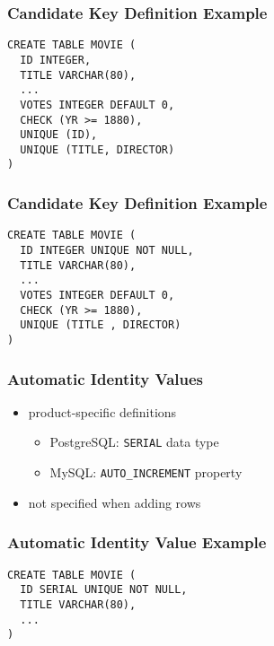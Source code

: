 \documentclass[dvipsnames]{beamer}
\theoremstyle{plain}
\begin{document}
\begin{frame}[fragile]
  \frametitle{Candidate Key Definition Example}

  \begin{example}
    \begin{lstlisting}
CREATE TABLE MOVIE (
  ID INTEGER,
  TITLE VARCHAR(80),
  ...
  VOTES INTEGER DEFAULT 0,
  CHECK (YR >= 1880),
  UNIQUE (ID),
  UNIQUE (TITLE, DIRECTOR)
)
    \end{lstlisting}
  \end{example}
\end{frame}

\begin{frame}[fragile]
  \frametitle{Candidate Key Definition Example}

  \begin{example}
    \begin{lstlisting}
CREATE TABLE MOVIE (
  ID INTEGER UNIQUE NOT NULL,
  TITLE VARCHAR(80),
  ...
  VOTES INTEGER DEFAULT 0,
  CHECK (YR >= 1880),
  UNIQUE (TITLE , DIRECTOR)
)
   \end{lstlisting}
  \end{example}
\end{frame}

\begin{frame}[fragile]
  \frametitle{Automatic Identity Values}

  \begin{itemize}
    \item product-specific definitions

    \begin{itemize}
      \item PostgreSQL: \texttt{SERIAL} data type
      \item MySQL: \texttt{AUTO\_INCREMENT} property
    \end{itemize}

    \pause
    \item not specified when adding rows
  \end{itemize}
\end{frame}

\begin{frame}[fragile]
  \frametitle{Automatic Identity Value Example}

  \begin{example}[PostgreSQL]
    \begin{lstlisting}
CREATE TABLE MOVIE (
  ID SERIAL UNIQUE NOT NULL,
  TITLE VARCHAR(80),
  ...
)
    \end{lstlisting}
  \end{example}
\end{frame}
\end{document}
